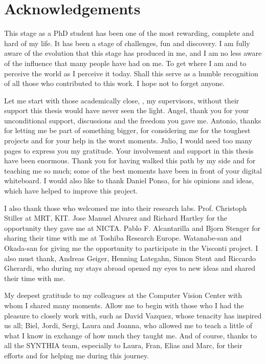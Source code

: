 \setlength{\parindent}{15pt}
\setlength{\parskip}{0em}

\chapter*{Acknowledgements}
\vspace{-15mm}
This stage as a PhD student has been one of the most rewarding, complete and hard of my life. It has been a stage of challenges, fun and discovery. I am fully aware of the evolution that this stage has produced in me, and I am no less aware of the influence that many people have had on me. To get where I am and to perceive the world as I perceive it today. Shall this serve as a humble recognition of all those who contributed to this work. I hope not to forget anyone.

Let me start with those academically close, \ie, my supervisors, without their support this thesis would have never seen the light. Angel, thank you for your unconditional support, discussions and  the freedom you gave me. Antonio, thanks for letting me be part of something bigger, for considering me for the toughest projects and for your help in the worst moments. Julio, I would need too many pages to express you my gratitude. Your involvement and support in this thesis have been enormous. Thank you for having walked this path by my side and for teaching me so much; some of the best moments have been in front of your digital whiteboard. I would also like to thank Daniel Ponsa, for his opinions and ideas, which have helped to improve this project.

I also thank those who welcomed me into their research labs. Prof. Christoph Stiller at MRT, KIT. Jose Manuel Alvarez and Richard Hartley for the opportunity they gave me at NICTA. Pablo F. Alcantarilla and Bjorn Stenger for sharing their time with me at Toshiba Research Europe. Watanabe-san and Okada-san for giving me the opportunity to participate in the Visconti project. I also must thank, Andreas Geiger, Henning Lategahn, Simon Stent and Riccardo Gherardi, who during my stays abroad opened my eyes to new ideas and shared their time with me.

My deepest gratitude to my colleagues at the Computer Vision Center with whom I shared many moments. Allow me to begin with those who I had the pleasure to closely work with, such as David Vazquez, whose tenacity has inspired us all; Biel, Jordi, Sergi, Laura and Joanna, who allowed me to teach a little of what I know in exchange of how much they taught me. And of course, thanks to all the SYNTHIA team, especially to Laura, Fran, Elias and Marc, for their efforts and for helping me during this journey.

